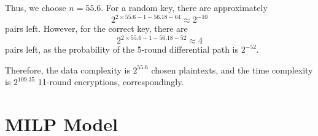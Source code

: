 \documentclass[journal=tosc,preprint]{iacrtrans}
\begin{document}
    Thus, we choose $n = 55.6$. For a random key, there are approximately
    \[
        2^{2 \times 55.6 - 1 - 56.18 - 64} \approx 2^{-10}
    \]
    pairs left. However, for the correct key, there are
    \[
        2^{2 \times 55.6 - 1 - 56.18 - 52} \approx 4
    \]
    pairs left, as the probability of the 5-round differential path is $2^{-52}$.

    Therefore, the data complexity is $2^{55.6}$ chosen plaintexts, and the time
    complexity is $2^{109.35}$ 11-round encryptions, correspondingly.

\newpage
\section{MILP Model}



\end{document}
